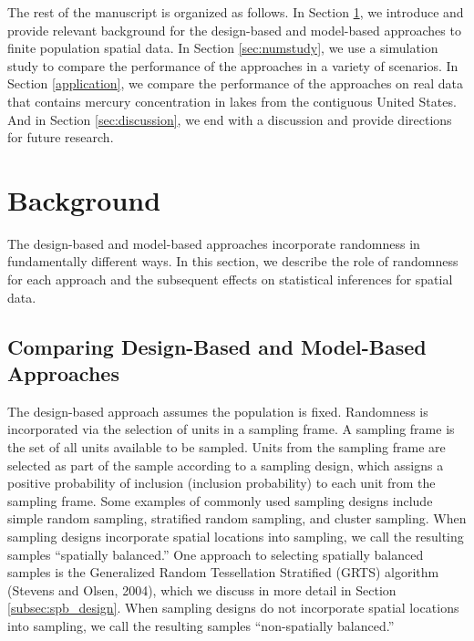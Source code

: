 \documentclass[]{elsarticle} %
\begin{document}
The rest of the manuscript is organized as follows. In Section
\ref{sec:background}, we introduce and provide relevant background for
the design-based and model-based approaches to finite population spatial
data. In Section \ref{sec:numstudy}, we use a simulation study to
compare the performance of the approaches in a variety of scenarios. In
Section \ref{application}, we compare the performance of the approaches
on real data that contains mercury concentration in lakes from the
contiguous United States. And in Section \ref{sec:discussion}, we end
with a discussion and provide directions for future research.

\hypertarget{sec:background}{%
\section{Background}\label{sec:background}}

The design-based and model-based approaches incorporate randomness in
fundamentally different ways. In this section, we describe the role of
randomness for each approach and the subsequent effects on statistical
inferences for spatial data.

\hypertarget{subsec:dvm_compare}{%
\subsection{Comparing Design-Based and Model-Based
Approaches}\label{subsec:dvm_compare}}

The design-based approach assumes the population is fixed. Randomness is
incorporated via the selection of units in a sampling frame. A sampling
frame is the set of all units available to be sampled. Units from the
sampling frame are selected as part of the sample according to a
sampling design, which assigns a positive probability of inclusion
(inclusion probability) to each unit from the sampling frame. Some
examples of commonly used sampling designs include simple random
sampling, stratified random sampling, and cluster sampling. When
sampling designs incorporate spatial locations into sampling, we call
the resulting samples ``spatially balanced.'' One approach to selecting
spatially balanced samples is the Generalized Random Tessellation
Stratified (GRTS) algorithm (Stevens and Olsen, 2004), which we discuss
in more detail in Section \ref{subsec:spb_design}. When sampling designs
do not incorporate spatial locations into sampling, we call the
resulting samples ``non-spatially balanced.''
\end{document}
